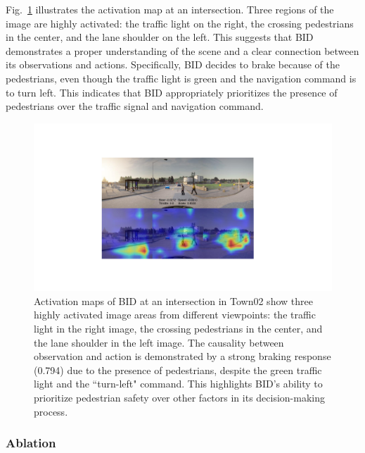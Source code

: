 Fig.~\ref{fig:attention_ped_greed} illustrates the activation map at an intersection. 
Three regions of the image are highly activated: the traffic light on the right, the crossing pedestrians in the center, and the lane shoulder on the left. 
This suggests that BID demonstrates a proper understanding of the scene and a clear connection between its observations and actions. 
Specifically, BID decides to brake because of the pedestrians, even though the traffic light is green and the navigation command is to turn left. 
This indicates that BID appropriately prioritizes the presence of pedestrians over the traffic signal and navigation command.


\begin{figure}[ht!]
	\centering
	\includegraphics[width=\linewidth]{fig/attention_ped_greed.pdf}
	\caption{Activation maps of BID at an intersection in Town02 show three highly activated image areas from different viewpoints: 
		the traffic light in the right image, the crossing pedestrians in the center, and the lane shoulder in the left image. 
		The causality between observation and action is demonstrated by a strong braking response (0.794) due to the presence of pedestrians, despite the green traffic light and the ``turn-left" command. 
		This highlights BID's ability to prioritize pedestrian safety over other factors in its decision-making process.}
	\label{fig:attention_ped_greed}
\end{figure}



\subsubsection{Ablation}

